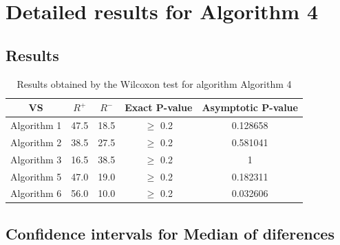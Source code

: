 \documentclass[a4paper,10pt]{article}
\begin{document}
 \clearpage 


\section{Detailed results for Algorithm 4}


\subsection{Results}

\begin{table}[!htp]
\centering\small
\begin{tabular}{
|c|c|c|c|c|}
\hline
 VS & $R^{+}$ & $R^{-}$ & Exact P-value & Asymptotic P-value \\ \hline 
Algorithm 1 & 47.5 & 18.5 & $\geq$ 0.2 & 0.128658\\ \hline 
Algorithm 2 & 38.5 & 27.5 & $\geq$ 0.2 & 0.581041\\ \hline 
Algorithm 3 & 16.5 & 38.5 & $\geq$ 0.2 & 1\\ \hline 
Algorithm 5 & 47.0 & 19.0 & $\geq$ 0.2 & 0.182311\\ \hline 
Algorithm 6 & 56.0 & 10.0 & $\geq$ 0.2 & 0.032606\\ \hline 

\end{tabular}
\caption{Results obtained by the Wilcoxon test for algorithm Algorithm 4}
\end{table}

\subsection{Confidence intervals for Median of diferences}
\end{document}
